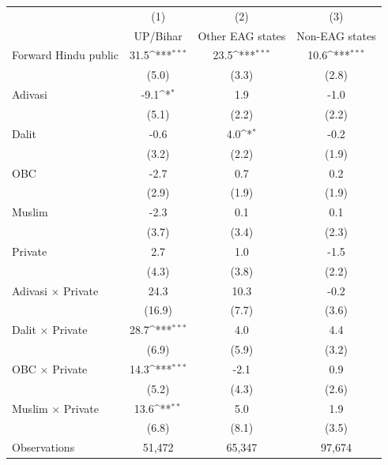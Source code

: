 {
\def\sym#1{\ifmmode^{#1}\else\(^{#1}\)\fi}
\begin{tabular}{l*{3}{c}}
\toprule
                    &\multicolumn{1}{c}{(1)}&\multicolumn{1}{c}{(2)}&\multicolumn{1}{c}{(3)}\\
                    &\multicolumn{1}{c}{UP/Bihar}&\multicolumn{1}{c}{Other EAG states}&\multicolumn{1}{c}{Non-EAG states}\\
\midrule
Forward Hindu public&        31.5\sym{***}&        23.5\sym{***}&        10.6\sym{***}\\
                    &       (5.0)         &       (3.3)         &       (2.8)         \\
\addlinespace
Adivasi             &        -9.1\sym{*}  &         1.9         &        -1.0         \\
                    &       (5.1)         &       (2.2)         &       (2.2)         \\
\addlinespace
Dalit               &        -0.6         &         4.0\sym{*}  &        -0.2         \\
                    &       (3.2)         &       (2.2)         &       (1.9)         \\
\addlinespace
OBC                 &        -2.7         &         0.7         &         0.2         \\
                    &       (2.9)         &       (1.9)         &       (1.9)         \\
\addlinespace
Muslim              &        -2.3         &         0.1         &         0.1         \\
                    &       (3.7)         &       (3.4)         &       (2.3)         \\
\addlinespace
Private             &         2.7         &         1.0         &        -1.5         \\
                    &       (4.3)         &       (3.8)         &       (2.2)         \\
\addlinespace
Adivasi $\times$ Private&        24.3         &        10.3         &        -0.2         \\
                    &      (16.9)         &       (7.7)         &       (3.6)         \\
\addlinespace
Dalit $\times$ Private&        28.7\sym{***}&         4.0         &         4.4         \\
                    &       (6.9)         &       (5.9)         &       (3.2)         \\
\addlinespace
OBC $\times$ Private&        14.3\sym{***}&        -2.1         &         0.9         \\
                    &       (5.2)         &       (4.3)         &       (2.6)         \\
\addlinespace
Muslim $\times$ Private&        13.6\sym{**} &         5.0         &         1.9         \\
                    &       (6.8)         &       (8.1)         &       (3.5)         \\
\midrule
Observations        &      51,472         &      65,347         &      97,674         \\
\bottomrule
\end{tabular}
}
